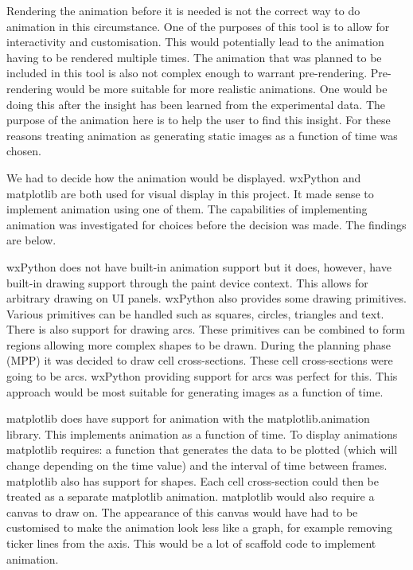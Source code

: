 Rendering the animation before it is needed is not the correct way to do animation in this circumstance.  One of the purposes of this tool is to allow for interactivity and customisation.  This would potentially lead to the animation having to be rendered multiple times.  The animation that was planned to be included in this tool is also not complex enough to warrant pre-rendering.  Pre-rendering would be more suitable for more realistic animations.  One would be doing this after the insight has been learned from the experimental data.  The purpose of the animation here is to help the user to find this insight.  For these reasons treating animation as generating static images as a function of time was chosen.

We had to decide how the animation would be displayed.  wxPython and matplotlib are both used for visual display in this project.  It made sense to implement animation using one of them.  The capabilities of implementing animation was investigated for choices before the decision was made.  The findings are below.

wxPython does not have built-in animation support but it does, however, have built-in drawing support through the paint device context.  This allows for arbitrary drawing on \ac{UI} panels.  wxPython also provides some drawing primitives.  Various primitives can be handled such as squares, circles, triangles and text.  There is also support for drawing arcs.  These primitives can be combined to form regions allowing more complex shapes to be drawn.  During the planning phase (MPP) it was decided to draw cell cross-sections.  These cell cross-sections were going to be arcs.  wxPython providing support for arcs was perfect for this.  This approach would be most suitable for generating images as a function of time.

matplotlib does have support for animation with the matplotlib.animation library.  This implements animation as a function of time.  To display animations matplotlib requires: a function that generates the data to be plotted (which will change depending on the time value) and the interval of time between frames.  matplotlib also has support for shapes.  Each cell cross-section could then be treated as a separate matplotlib animation.  matplotlib would also require a canvas to draw on.  The appearance of this canvas would have had to be customised to make the animation look less like a graph, for example removing ticker lines from the axis.  This would be a lot of scaffold code to implement animation.

